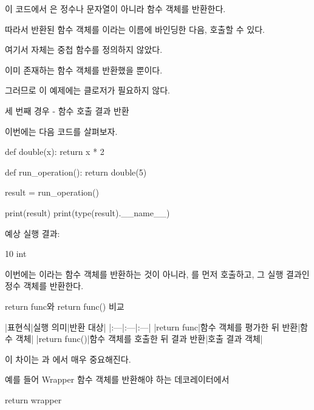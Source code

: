 이 코드에서 은 정수나 문자열이 아니라 함수 객체를 반환한다.

따라서 반환된 함수 객체를 이라는 이름에 바인딩한 다음, 호출할 수 있다.

여기서  자체는 중첩 함수를 정의하지 않았다.

이미 존재하는 함수 객체를 반환했을 뿐이다.

그러므로 이 예제에는 클로저가 필요하지 않다.

\begin{dhknote}
\begin{dhksmry}[centered]
세 번째 경우 - 함수 호출 결과 반환
\end{dhksmry}
\end{dhknote}

이번에는 다음 코드를 살펴보자.

\begin{dhkcode}
def double(x):
    return x * 2

def run_operation():
    return double(5)

result = run_operation()

print(result)
print(type(result).__name__)
\end{dhkcode}

예상 실행 결과:

\begin{dhkzsh}
10
int
\end{dhkzsh}

이번에는 이라는 함수 객체를 반환하는 것이 아니라, 를 먼저 호출하고, 그 실행 결과인 정수 객체를 반환한다.

\begin{dhknote}
\begin{dhksmry}[centered]
return func와 return func() 비교
\end{dhksmry}
\end{dhknote}

\begin{dhktable}
|표현식|실행 의미|반환 대상|
|:---|:---|:---|
|return func|함수 객체를 평가한 뒤 반환|함수 객체|
|return func()|함수 객체를 호출한 뒤 결과 반환|호출 결과 객체|
\end{dhktable}

이 차이는 과 에서 매우 중요해진다.

예를 들어 Wrapper 함수 객체를 반환해야 하는 데코레이터에서

\begin{dhkcode}
return wrapper
\end{dhkcode}

